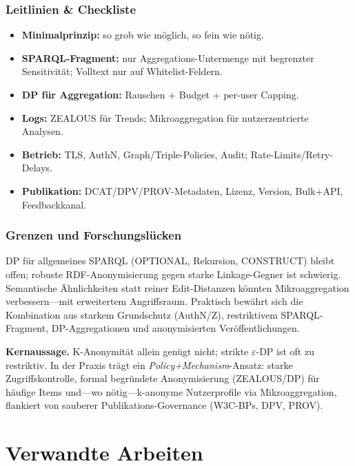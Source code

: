 \subsection{Leitlinien \& Checkliste}
\begin{itemize}
  \item \textbf{Minimalprinzip:} so grob wie möglich, so fein wie nötig.
  \item \textbf{SPARQL-Fragment:} nur Aggregations-Untermenge mit begrenzter Sensitivität; Volltext nur auf Whitelist-Feldern.
  \item \textbf{DP für Aggregation:} Rauschen + Budget + per-user Capping.
  \item \textbf{Logs:} ZEALOUS für Trends; Mikroaggregation für nutzerzentrierte Analysen.
  \item \textbf{Betrieb:} TLS, AuthN, Graph/Triple-Policies, Audit; Rate-Limits/Retry-Delays.
  \item \textbf{Publikation:} DCAT/DPV/PROV-Metadaten, Lizenz, Version, Bulk+API, Feedbackkanal.
\end{itemize}

\subsection{Grenzen und Forschungslücken}
DP für allgemeines SPARQL (OPTIONAL, Rekursion, CONSTRUCT) bleibt offen; robuste RDF-Anonymisierung gegen starke Linkage-Gegner ist schwierig. Semantische Ähnlichkeiten statt reiner Edit-Distanzen könnten Mikroaggregation verbessern—mit erweitertem Angriffsraum. Praktisch bewährt sich die Kombination aus starkem Grundschutz (AuthN/Z), restriktivem SPARQL-Fragment, DP-Aggregationen und anonymisierten Veröffentlichungen.

\medskip
\noindent\textbf{Kernaussage.} K-Anonymität allein genügt nicht; strikte $\varepsilon$-DP ist oft zu restriktiv. In der Praxis trägt ein \emph{Policy+Mechanism}-Ansatz: starke Zugriffskontrolle, formal begründete Anonymisierung (ZEALOUS/DP) für häufige Items und—wo nötig—k-anonyme Nutzerprofile via Mikroaggregation, flankiert von sauberer Publikations-Governance (W3C-BPs, DPV, PROV).












\chapter{Verwandte Arbeiten}
\label{sec:related-work}

